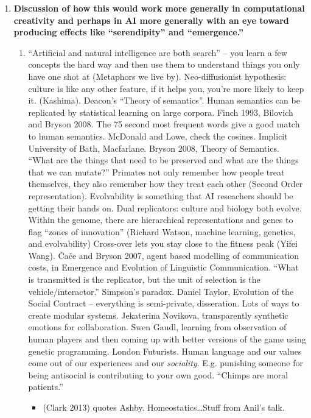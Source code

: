 \documentclass[letter]{article}
\begin{document}
\begin{mdframed}
\begin{enumerate}[start=4]
\item \textbf{Discussion of how this would work more generally in
  computational creativity and perhaps in AI more generally with an
  eye toward producing effects like ``serendipity'' and
  ``emergence.''}
\begin{enumerate}
\item ``Artificial and natural intelligence are both search'' -- you learn a few concepts the hard way and then use them to understand things you only have one shot at (Metaphors we live by).  Neo-diffusionist hypothesis: culture is like any other feature, if it helps you, you're more likely to keep it.  (Kashima).  Deacon's ``Theory of semantics''.  Human semantics can be replicated by statistical learning on large corpora.  Finch 1993, Bilovich and Bryson 2008.  The 75 second most frequent words give a good match to human semantics.  McDonald and Lowe, check the cosines.  Implicit University of Bath, Macfarlane.  Bryson 2008, Theory of Semantics.  ``What are the things that need to be preserved and what are the things that we can mutate?''  Primates not only remember how people treat themselves, they also remember how they treat each other (Second Order representation).  Evolvability is something that AI reseachers should be getting their hands on.  Dual replicators: culture and biology both evolve.  Within the genome, there are hierarchical representations and genes to flag ``zones of innovation'' (Richard Watson, machine learning, genetics, and evolvability)  Cross-over lets you stay close to the fitness peak (Yifei Wang).  \v{C}a\v{c}e and Bryson 2007, agent based modelling of communication costs, in Emergence and Evolution of Linguistic Communication.  ``What is transmitted is the replicator, but the unit of selection is the vehicle/interactor.''  Simpson's paradox.  Daniel Taylor, Evolution of the Social Contract -- everything is semi-private, disseration.  Lots of ways to create modular systems.  Jekaterina Novikova, transparently synthetic emotions for collaboration.  Swen Gaudl, learning from observation of human players and then coming up with better versions of the game using genetic programming.  London Futurists.  Human language and our values come out of our experiences and our \emph{sociality}.  E.g. punishing someone for being antisocial is contributing to your own good.  ``Chimps are moral patients.''
\begin{itemize}
\item (Clark 2013) quotes Ashby.  Homeostatics\ldots Stuff from Anil's talk.

\end{itemize}
\end{enumerate}
\end{enumerate}
\end{mdframed}
\end{document}
